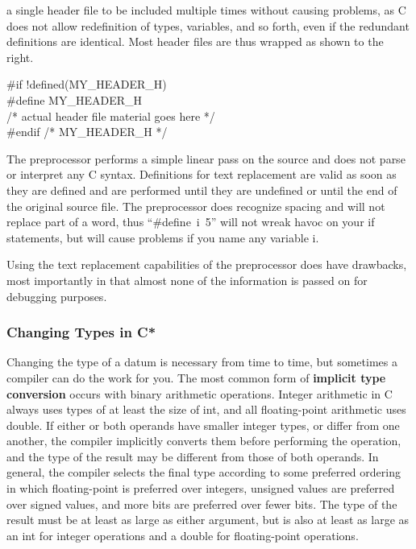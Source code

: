 \begin{minipage}{3in}
a single header file to
be included multiple times without causing problems, as C does not
allow redefinition of types, variables, and so forth, even if the
redundant 
definitions are identical.  Most header files are thus wrapped as shown
to the right.
\end{minipage}\hspace{.2in}%
\begin{minipage}{3.5in}
{\fix
\begin{tabbing}
\#if !defined(MY\_HEADER\_H)\\
\#define MY\_HEADER\_H\\
/* actual header file material goes here */\\
\#endif /* MY\_HEADER\_H */\\
\end{tabbing}
}
\end{minipage}\vspace{2pt}

The preprocessor performs a simple linear pass on the source and does
not parse or interpret any C syntax.
%
Definitions for text replacement are valid as soon as they are defined
and are performed until they are undefined or until the end of the
original source file.
%
The preprocessor does recognize spacing and will not replace part of a
word, thus ``{\tfix \#define~i~5}'' will not wreak havoc on your {\tfix
if} statements, but will cause problems if you name any variable {\tfix i}.

Using the text replacement capabilities of the preprocessor does have
drawbacks, most importantly in that almost none of the information is
passed on for debugging purposes.  \\

\subsubsection{Changing Types in C*}

Changing the type of a datum is necessary from time to time, but
sometimes a compiler can do the work for you.
%
The most common form of {\bf implicit type conversion} occurs with binary
arithmetic operations.  Integer arithmetic in C always uses types of
at least the size of {\tfix int}, and all floating-point arithmetic uses
{\tfix double}.
%
If either or both operands have smaller integer types, or differ from
one another, the compiler implicitly converts them before performing
the operation, and the type of the result may be different from those of
both operands.
%
In general, the compiler selects the final type according to some
preferred ordering in which floating-point is preferred over integers,
unsigned values are preferred over signed values, and more bits are
preferred over fewer bits.
%
The type of the result must be at least as large as either argument,
but is also at least as large as an {\tfix int} for integer operations
and a {\tfix double} for floating-point operations.

